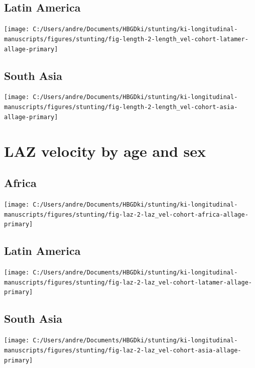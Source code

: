 \documentclass[
  9pt,
]{book}
\begin{document}
\hypertarget{latin-america-3}{%
\subsection{Latin America}\label{latin-america-3}}

\texttt{[image: C:/Users/andre/Documents/HBGDki/stunting/ki-longitudinal-manuscripts/figures/stunting/fig-length-2-length\_vel-cohort-latamer-allage-primary]}

\hypertarget{south-asia-3}{%
\subsection{South Asia}\label{south-asia-3}}

\texttt{[image: C:/Users/andre/Documents/HBGDki/stunting/ki-longitudinal-manuscripts/figures/stunting/fig-length-2-length\_vel-cohort-asia-allage-primary]}

\hypertarget{laz-velocity-by-age-and-sex}{%
\section{LAZ velocity by age and sex}\label{laz-velocity-by-age-and-sex}}

\hypertarget{africa-4}{%
\subsection{Africa}\label{africa-4}}

\texttt{[image: C:/Users/andre/Documents/HBGDki/stunting/ki-longitudinal-manuscripts/figures/stunting/fig-laz-2-laz\_vel-cohort-africa-allage-primary]}

\hypertarget{latin-america-4}{%
\subsection{Latin America}\label{latin-america-4}}

\texttt{[image: C:/Users/andre/Documents/HBGDki/stunting/ki-longitudinal-manuscripts/figures/stunting/fig-laz-2-laz\_vel-cohort-latamer-allage-primary]}

\hypertarget{south-asia-4}{%
\subsection{South Asia}\label{south-asia-4}}

\texttt{[image: C:/Users/andre/Documents/HBGDki/stunting/ki-longitudinal-manuscripts/figures/stunting/fig-laz-2-laz\_vel-cohort-asia-allage-primary]}
\end{document}

